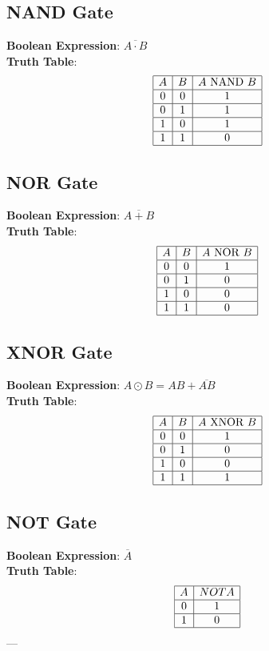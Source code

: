 \documentclass[10pt]{article}
\begin{document}
\begin{multicols}{2}
\subsection{NAND Gate}
\textbf{Boolean Expression}: \( \overline{A \cdot B} \) \\
\textbf{Truth Table}:
\[
\begin{array}{|c|c|c|}
\hline
A & B & A \text{ NAND } B \\
\hline
0 & 0 & 1 \\\hline
0 & 1 & 1 \\\hline
1 & 0 & 1 \\\hline
1 & 1 & 0 \\\hline
\end{array}
\]

\subsection{NOR Gate}
\textbf{Boolean Expression}: \( \overline{A + B} \) \\
\textbf{Truth Table}:
\[
\begin{array}{|c|c|c|}
\hline
A & B & A \text{ NOR } B \\
\hline
0 & 0 & 1 \\\hline
0 & 1 & 0 \\\hline
1 & 0 & 0 \\\hline
1 & 1 & 0 \\\hline
\end{array}
\]

\subsection{XNOR Gate}
\textbf{Boolean Expression}: \( A \odot B = AB + \overline{AB} \) \\
\textbf{Truth Table}:
\[
\begin{array}{|c|c|c|}
\hline
A & B & A \text{ XNOR } B \\
\hline
0 & 0 & 1 \\\hline
0 & 1 & 0 \\\hline
1 & 0 & 0 \\\hline
1 & 1 & 1 \\\hline
\end{array}
\]

\subsection{NOT Gate}
\textbf{Boolean Expression}: \( \overline{A} \) \\
\textbf{Truth Table}:
\[
\begin{array}{|c|c|}
\hline
A & NOT A \\
\hline
0 & 1 \\\hline
1 & 0 \\\hline
\end{array}
\]
--- %

\end{multicols}
\end{document}

